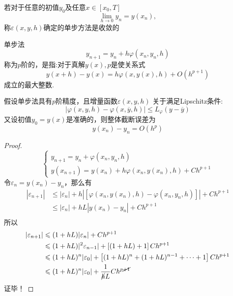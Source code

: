 \begin{definition}[收敛]
    若对于任意的初值$y_0$及任意$x\in[x_0,T]$
    \[
        \lim_{h\to0}y_n=y(x_n),
    \]
    称$\varepsilon(x,y,h)$确定的单步方法是收敛的
\end{definition}
\begin{definition}[单步法的阶数]
    单步法
    \[
        y_{n+1}=y_n+h\varphi(x_n,y_n,h)
    \]
    称为\colorbox{cyan!50}{$p$阶}的，是指:对于真解$y(x),p$是使关系式
    \[
        y(x+h)-y(x)=h\varphi(x,y(x),h)+O(h^{p+1})
    \]
    成立的最大整数.
\end{definition}
\begin{theorem}
    假设单步法具有$p$阶精度，且增量函数$\varepsilon(x,y,h)$ 关于满足Lipschitz条件:
    \[
        \mid\varphi(x,y,h)-\varphi(x,\overline{y},h)\mid\leq L_\varphi(y-\overline{y})
    \]
    又设初值$y_0= y(x)$是准确的，则整体截断误差为
    \[
        y(x_n)-y_n=O(h^p)
    \]
\end{theorem}
\begin{proof}
    \[
        \begin{cases}
            y_{n+1} = y_n + \varphi(x_n,y_n,h)\\
            y(x_{n+1}) = y(x_{n})+h\varphi(x_{n},y(x_{n}),h) + Ch^{p+1}
        \end{cases}
    \]
    令$\varepsilon_{n} = y(x_{n})-y_{n}$，那么有
    \[
        \begin{aligned}
            |\varepsilon_{n+1}| & \leqslant |\varepsilon_{n}| + h|\left[\varphi(x_{n},y(x_{n}),h) -\varphi(x_n,y_n,h) \right]| + Ch^{p+1}\\
            &\leqslant |\varepsilon_{n}| + hL|y(x_{n})-y_n| + Ch^{p+1}\\
        \end{aligned}
    \]
    所以
    \[
        \begin{aligned}
            |\varepsilon_{n+1}| & \leqslant (1+hL)|\varepsilon_{n}| + Ch^{p+1}\\
            &\leqslant(1+hL)|^2\varepsilon_{n-1}| + \left[ (1+hL)+1 \right]Ch^{p+1}\\
            &\leqslant (1+hL)^{n}|\varepsilon_0| + \left[(1+hL)^n+(1+hL)^{n-1} + \cdots + 1  \right]Ch^{p+1}\\
            &\leqslant (1+hL)^{n}|\varepsilon_0| + \dfrac{1}{\cancel{h}L}Ch^{p\cancel{+1}}
        \end{aligned}
    \]
    证毕！
\end{proof}
